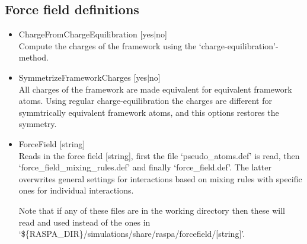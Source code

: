 \subsection*{Force field definitions}
\begin{itemize}
\item{ChargeFromChargeEquilibration [yes$|$no]}\\
Compute the charges of the framework using the `charge-equilibration'-method.
\item{SymmetrizeFrameworkCharges [yes$|$no]}\\
All charges of the framework are made equivalent for equivalent framework atoms. 
Using regular charge-equilibration the charges are different for symmtrically equivalent
framework atoms, and this options restores the symmetry.
\item{ForceField [string]}\\
Reads in the force field [string], first the file `pseudo\_atoms.def' is read, then 
`force\_field\_mixing\_rules.def' and finally `force\_field.def'. The latter overwrites
general settings for interactions based on mixing rules with specific ones for individual
interactions. 

Note that if any of these files are in the working directory then these will read and used instead of the
ones in `\$\{RASPA\_DIR\}/simulations/share/raspa/forcefield/[string]'.


\end{itemize}
